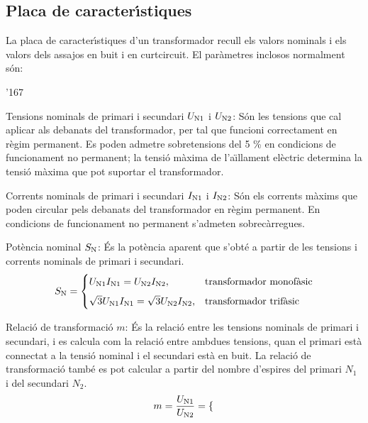 \subsection{Placa de caracter\'{\i}stiques}

La  placa de caracter\'{\i}stiques d'un transformador recull els valors nominals  i els valors dels assajos
en buit i en curtcircuit. El par\`{a}metres inclosos normalment s\'{o}n:
\begin{dinglist}{'167}
   \item Tensions nominals de primari i secundari  $U_\mathrm{N1}$ i $U_\mathrm{N2}$: S\'{o}n les tensions que cal aplicar als debanats del transformador, per tal que funcioni correctament en r\`{e}gim permanent. Es poden admetre sobretensions del 5 \% en condicions de funcionament no permanent; la tensi\'{o} m\`{a}xima de l'a\"{\i}llament el\`{e}ctric determina la tensi\'{o} m\`{a}xima que pot suportar el transformador.
   \item Corrents nominals de primari i secundari  $I_\mathrm{N1}$ i $I_\mathrm{N2}$: S\'{o}n els corrents m\`{a}xims que poden circular pels debanats del transformador en r\`{e}gim permanent. En condicions de funcionament no permanent s'admeten sobrec\`{a}rregues.
   \item Pot\`{e}ncia nominal $S_\mathrm{N}$: \'{E}s la pot\`{e}ncia aparent que s'obt\'{e} a partir de les tensions i corrents nominals de primari i secundari.
       \begin{equation}
        S_\mathrm{N} = \begin{cases} U_\mathrm{N1} I_\mathrm{N1} = U_\mathrm{N2} I_\mathrm{N2}, & \text{transformador monof\`{a}sic} \\[2mm]
        \sqrt{3} U_\mathrm{N1} I_\mathrm{N1} = \sqrt{3} U_\mathrm{N2} I_\mathrm{N2}, & \text{transformador trif\`{a}sic} \end{cases}
       \end{equation}
   \item Relaci\'{o} de transformaci\'{o} $m$: \'{E}s la relaci\'{o} entre les tensions nominals de primari i secundari, i es calcula com la relaci\'{o} entre ambdues tensions, quan el primari est\`{a} connectat a la tensi\'{o} nominal i el secundari est\`{a} en buit. La relaci\'{o} de  transformaci\'{o} tamb\'{e} es pot calcular a partir del nombre d'espires del primari $N_1$ i del secundari $N_2$.
       \begin{equation}
        m = \frac{U_\mathrm{N1}}{U_\mathrm{N2}} =  \begin{cases}

\end{cases}
\end{equation}
\end{dinglist}
